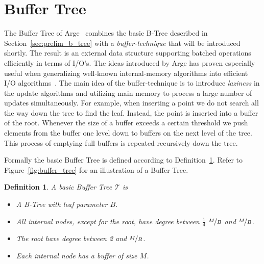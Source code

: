 \documentclass[twoside,11pt,openright]{report}
\newtheorem{definition}{Definition}
\begin{document}
\section{Buffer Tree}
\label{sec:prelim_buffer_tree}
The Buffer Tree of Arge~\cite{Arge:1995:BTN:645930.672850} combines the basic B-Tree described in Section~\ref{sec:prelim_b_tree} with a \textit{buffer-technique} that will be introduced shortly. The result is an external data structure supporting batched operations efficiently in terms of I/O's. The ideas introduced by Arge has proven especially useful when generalizing well-known internal-memory algorithms into efficient I/O algorithms~\cite{Arge:1995:BTN:645930.672850}. The main idea of the buffer-technique is to introduce \textit{laziness} in the update algorithms and utilizing main memory to process a large number of updates simultaneously. For example, when inserting a point we do not search all the way down the tree to find the leaf. Instead, the point is inserted into a buffer of the root. Whenever the size of a buffer exceeds a certain threshold we push elements from the buffer one level down to buffers on the next level of the tree. This process of emptying full buffers is repeated recursively down the tree.

Formally the basic Buffer Tree is defined according to Definition~\ref{def:buffer_tree}. Refer to Figure~\ref{fig:buffer_tree} for an illustration of a Buffer Tree.

\begin{definition}
\label{def:buffer_tree}
A basic Buffer Tree $\mathcal{T}$ is
\begin{itemize}
	\item A B-Tree with leaf parameter $B$.
	\item All internal nodes, except for the root, have degree between $\frac{1}{4}$ $\nicefrac{M}{B}$ and $\nicefrac{M}{B}$.
	\item The root have degree between 2 and $\nicefrac{M}{B}$.
	\item Each internal node has a buffer of size $M$.
\end{itemize}
\end{definition}
\end{document}
